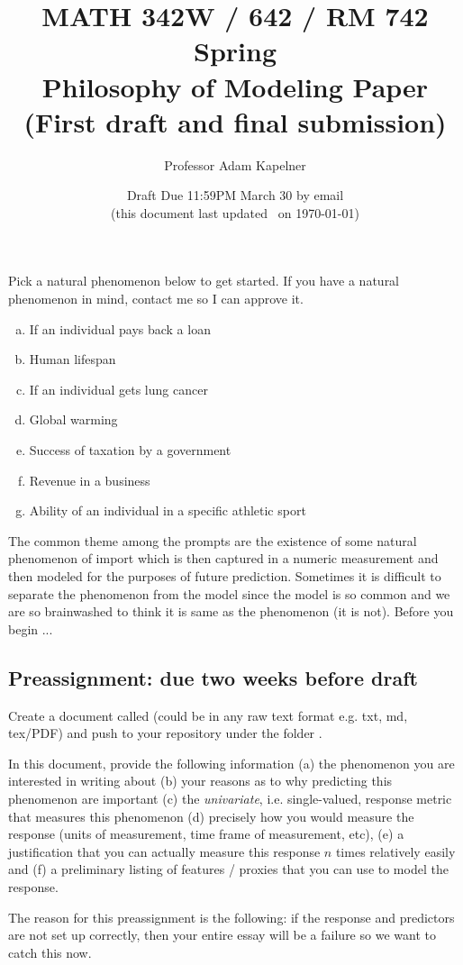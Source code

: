 \documentclass[12pt]{article}
\title{MATH 342W / 642 / RM 742 Spring \the\year \\ Philosophy of Modeling Paper \\ (First draft and final submission)}
\author{Professor Adam Kapelner} %
\date{Draft Due 11:59PM March 30 by email \\ \vspace{0.5cm} \small (this document last updated \currenttime~on \today)}
\begin{document}
\maketitle

\noindent Pick a natural phenomenon below to get started. If you have a natural phenomenon in mind, contact me so I can approve it.

\begin{enumerate}[(a)]
\item If an individual pays back a loan
\item Human lifespan
\item If an individual gets lung cancer
\item Global warming
\item Success of taxation by a government
\item Revenue in a business
\item Ability of an individual in a specific athletic sport 
\end{enumerate}

The common theme among the prompts are the existence of some natural phenomenon of import which is then captured in a numeric measurement and then modeled for the purposes of future prediction. Sometimes it is difficult to separate the phenomenon from the model since the model is so common and we are so brainwashed to think it is same as the phenomenon (it is not). Before you begin ...

\subsection*{Preassignment: due two weeks before draft}

Create a document called  (could be in any raw text format e.g. txt, md, tex/PDF) and push to your repository under the folder . 

In this document, provide the following information (a) the phenomenon you are interested in writing about (b) your reasons as to why predicting this phenomenon are important (c) the \emph{univariate}, i.e. single-valued, response metric that measures this phenomenon (d) precisely how you would measure the response (units of measurement, time frame of measurement, etc), (e) a justification that you can actually measure this response $n$ times relatively easily and (f) a preliminary listing of features / proxies that you can use to model the response. 

The reason for this preassignment is the following: if the response and predictors are not set up correctly, then your entire essay will be a failure so we want to catch this now.
\end{document}
